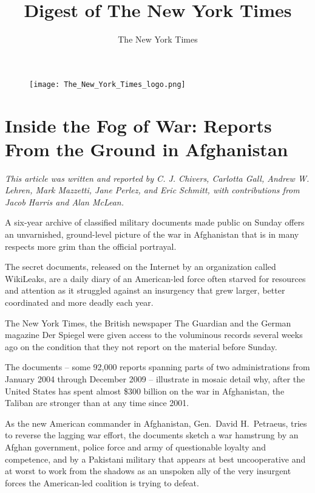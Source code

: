 ﻿\documentclass[12pt]{article}
\title{Digest of The New York Times}
\author{The New York Times}
\begin{document}
\date{}
\thispagestyle{empty}

\begin{figure}
\texttt{[image: The\_New\_York\_Times\_logo.png]}
\vspace{-15ex}
\end{figure}
\renewcommand\contentsname{}
{\footnotesize\textsf{\tableofcontents}}

\clearpage
\setcounter{page}{1}

\section{Inside the Fog of War: Reports From the Ground in Afghanistan}

\textit{This article was written and reported by C. J. Chivers, Carlotta Gall, Andrew W. Lehren,
  Mark Mazzetti, Jane Perlez, and Eric Schmitt, with contributions from Jacob Harris and Alan
  McLean.}

\lettrine{A}{} six-year archive of classified military documents made public
on Sunday offers an unvarnished, ground-level picture of the war in Afghanistan that is in many
respects more grim than the official portrayal.

The secret documents, released on the Internet by an organization called WikiLeaks, are a daily
diary of an American-led force often starved for resources and attention as it struggled against an
insurgency that grew larger, better coordinated and more deadly each year.

The New York Times, the British newspaper The Guardian and the German magazine Der Spiegel were
given access to the voluminous records several weeks ago on the condition that they not report on
the material before Sunday.

The documents -- some 92,000 reports spanning parts of two administrations from January 2004 through
December 2009 -- illustrate in mosaic detail why, after the United States has spent almost \$300
billion on the war in Afghanistan, the Taliban are stronger than at any time since 2001.

As the new American commander in Afghanistan, Gen.~David H.~Petraeus, tries to reverse the lagging
war effort, the documents sketch a war hamstrung by an Afghan government, police force and army of
questionable loyalty and competence, and by a Pakistani military that appears at best uncooperative
and at worst to work from the shadows as an unspoken ally of the very insurgent forces the
American-led coalition is trying to defeat.
\end{document}
